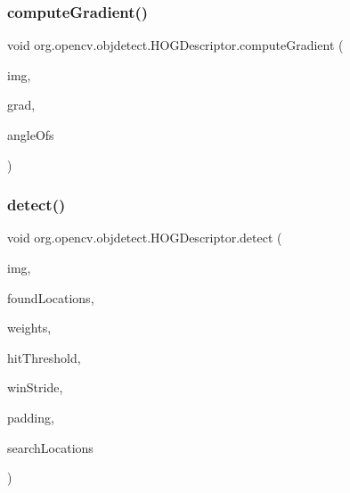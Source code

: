 \mbox{\label{classorg_1_1opencv_1_1objdetect_1_1_h_o_g_descriptor_a3901af3c2c750a427cb8bf250f00871d}} 
\subsubsection{\texorpdfstring{compute\+Gradient()}{computeGradient()}\hspace{0.1cm}{\footnotesize\ttfamily [2/2]}}
{\footnotesize\ttfamily void org.\+opencv.\+objdetect.\+H\+O\+G\+Descriptor.\+compute\+Gradient (\begin{DoxyParamCaption}\item[{\mbox{\hyperlink{classorg_1_1opencv_1_1core_1_1_mat}{Mat}}}]{img,  }\item[{\mbox{\hyperlink{classorg_1_1opencv_1_1core_1_1_mat}{Mat}}}]{grad,  }\item[{\mbox{\hyperlink{classorg_1_1opencv_1_1core_1_1_mat}{Mat}}}]{angle\+Ofs }\end{DoxyParamCaption})}

\mbox{\label{classorg_1_1opencv_1_1objdetect_1_1_h_o_g_descriptor_a030da8403a85d584e1dc1957838d4336}} 
\subsubsection{\texorpdfstring{detect()}{detect()}\hspace{0.1cm}{\footnotesize\ttfamily [1/2]}}
{\footnotesize\ttfamily void org.\+opencv.\+objdetect.\+H\+O\+G\+Descriptor.\+detect (\begin{DoxyParamCaption}\item[{\mbox{\hyperlink{classorg_1_1opencv_1_1core_1_1_mat}{Mat}}}]{img,  }\item[{\mbox{\hyperlink{classorg_1_1opencv_1_1core_1_1_mat_of_point}{Mat\+Of\+Point}}}]{found\+Locations,  }\item[{\mbox{\hyperlink{classorg_1_1opencv_1_1core_1_1_mat_of_double}{Mat\+Of\+Double}}}]{weights,  }\item[{double}]{hit\+Threshold,  }\item[{\mbox{\hyperlink{classorg_1_1opencv_1_1core_1_1_size}{Size}}}]{win\+Stride,  }\item[{\mbox{\hyperlink{classorg_1_1opencv_1_1core_1_1_size}{Size}}}]{padding,  }\item[{\mbox{\hyperlink{classorg_1_1opencv_1_1core_1_1_mat_of_point}{Mat\+Of\+Point}}}]{search\+Locations }\end{DoxyParamCaption})}

